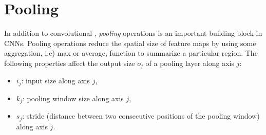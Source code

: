 \section{Pooling}\label{sec:pooling}

In addition to convolutional , {\em pooling\/} operations
is an important building block in CNNs. Pooling operations reduce the spatial size of feature maps by using some aggregation, i.e) max or average, function to summarize a particular region.
The following properties affect the output size $o_j$ of a pooling layer
along axis $j$:

\begin{itemize}
    \item $i_j$: input size along axis $j$,
    \item $k_j$: pooling window size along axis $j$,
    \item $s_j$: stride (distance between two consecutive positions of the
        pooling window) along axis $j$.
\end{itemize}
